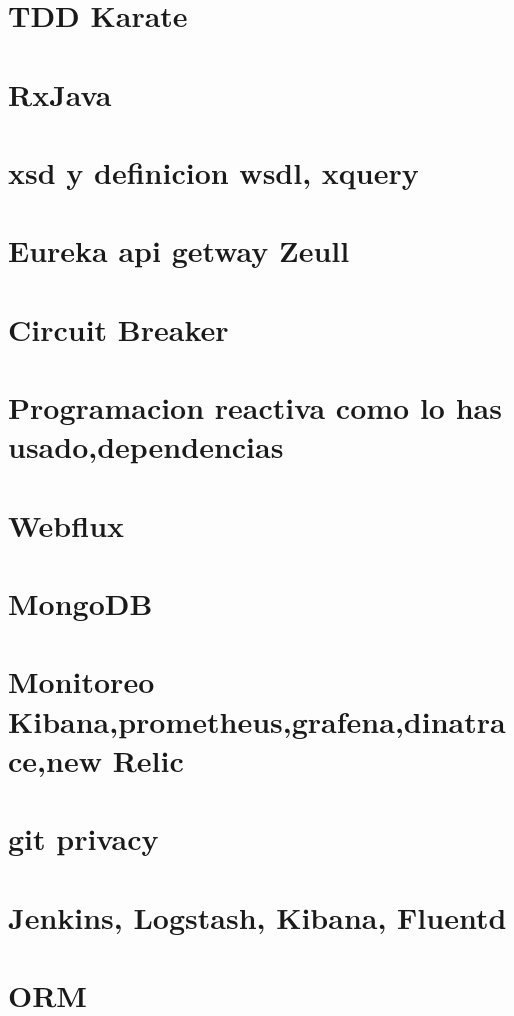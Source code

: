 \section{TDD Karate}
\section{RxJava}
\section{xsd y definicion wsdl, xquery}
\section{ Eureka api getway Zeull}
\section{Circuit Breaker}
\section{Programacion reactiva como lo has usado,dependencias}
\section{Webflux}
\section{MongoDB}
\section{Monitoreo Kibana,prometheus,grafena,dinatrace,new Relic}
\section{git privacy}
\section{Jenkins, Logstash, Kibana, Fluentd}
\section{ORM}